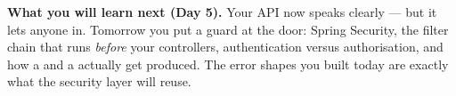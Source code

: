 \begin{keyidea}
\textbf{What you will learn next (Day 5).} Your API now speaks clearly --- but it lets anyone in. Tomorrow you put a guard at the door: Spring Security, the filter chain that runs \emph{before} your controllers, authentication versus authorisation, and how a  and a  actually get produced. The error shapes you built today are exactly what the security layer will reuse.
\end{keyidea}
